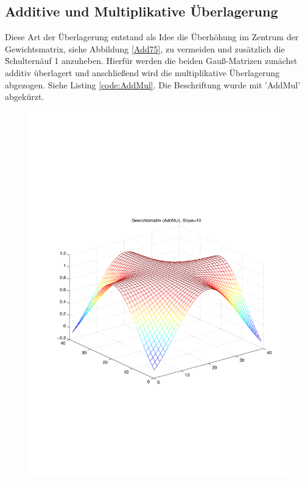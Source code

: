 \newpage
\subsection{Additive und Multiplikative Überlagerung}
Diese Art der Überlagerung entstand als Idee die Überhöhung im Zentrum der Gewichtsmatrix, siehe Abbildung \ref{Add75}, zu vermeiden und zusätzlich die \"Schultern\" auf 1 anzuheben. Hierfür werden die beiden Gauß-Matrizen zunächst additiv überlagert und anschließend wird die multiplikative Überlagerung abgezogen. Siehe Listing \ref{code:AddMul}. Die Beschriftung wurde mit 'AddMul' abgekürzt.

\begin{figure}[hbt]
	\begin{minipage}{0.45\textwidth}
		\includegraphics[trim=70 200 32 242, clip, width=\textwidth]{./Bilder/Auswertung/Gewichtsmatrix/Gewichtsmatrix_AddMul_Slope_10}

\end{minipage}
\end{figure}

